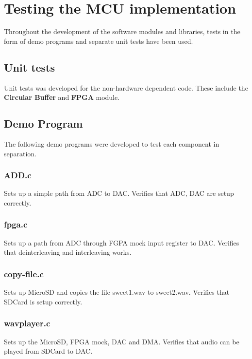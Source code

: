 \section{Testing the MCU implementation}

Throughout the development of the software modules and libraries, tests in the form
of demo programs and separate unit tests have been used.

\subsection{Unit tests}

Unit tests was developed for the non-hardware dependent code. These include the
{\bf Circular Buffer} and {\bf FPGA} module.

\subsection{Demo Program}
The following demo programs were developed to test each component in separation.


\subsubsection{ADD.c}
Sets up a simple path from ADC to DAC.
Verifies that ADC, DAC are setup correctly.

\subsubsection{fpga.c}
Sets up a path from ADC through FGPA mock input register to DAC.
Verifies that deinterleaving and interleaving works.

\subsubsection{copy-file.c}
Sets up MicroSD and copies the file sweet1.wav to sweet2.wav.
Verifies that SDCard is setup correctly.

\subsubsection{wavplayer.c}
Sets up the MicroSD, FPGA mock, DAC and DMA.
Verifies that audio can be played from SDCard to DAC.
